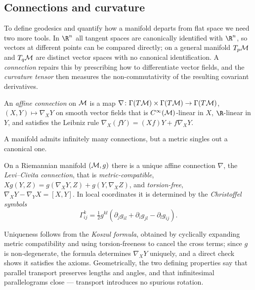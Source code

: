 \subsection{Connections and curvature}
\label{subsec:geo:curvature}

To define geodesics and quantify how a manifold departs from flat space we need
two more tools. In $\R^n$ all tangent spaces are canonically identified with
$\R^n$, so vectors at different points can be compared directly; on a general
manifold $T_p\mathcal{M}$ and $T_q\mathcal{M}$ are distinct vector spaces with no canonical
identification. A \emph{connection} repairs this by prescribing how to
differentiate vector fields, and the \emph{curvature tensor} then measures the
non-commutativity of the resulting covariant derivatives.

\begin{definition}
\label{def:geo:connection}
An \emph{affine connection} on $\mathcal{M}$ is a map $\nabla \colon \Gamma(T\mathcal{M}) \times
\Gamma(T\mathcal{M}) \to \Gamma(T\mathcal{M})$, $(X,Y) \mapsto \nabla_X Y$ on smooth vector fields
that is $C^\infty(\mathcal{M})$-linear in $X$, $\R$-linear in $Y$, and satisfies the
Leibniz rule $\nabla_X(fY) = (Xf)Y + f\nabla_X Y$.
\end{definition}

A manifold admits infinitely many connections, but a metric singles out a
canonical one.

\begin{theorem}
\label{thm:geo:levi-civita}
On a Riemannian manifold $(\mathcal{M}, g)$ there is a unique affine connection $\nabla$,
the \emph{Levi--Civita connection}, that is
\emph{metric-compatible}, $X g(Y,Z) = g(\nabla_X Y, Z) + g(Y, \nabla_X Z)$, and
\emph{torsion-free}, $\nabla_X Y - \nabla_Y X = [X,Y]$.
In local coordinates it is determined by the \emph{Christoffel symbols}
\[
  \Gamma^k_{ij} = \tfrac{1}{2} g^{kl}\!\left(
    \partial_j g_{il} + \partial_i g_{jl} - \partial_l g_{ij}\right).
\]
\end{theorem}

Uniqueness follows from the \emph{Koszul formula}, obtained by cyclically
expanding metric compatibility and using torsion-freeness to cancel the cross
terms; since $g$ is non-degenerate, the formula determines $\nabla_X Y$
uniquely, and a direct check shows it satisfies the axioms. Geometrically, the
two defining properties say that parallel transport preserves lengths and
angles, and that infinitesimal parallelograms close --- transport introduces no
spurious rotation.

